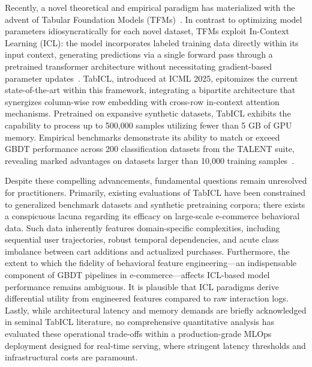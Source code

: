 \documentclass[conference]{IEEEtran}
\begin{document}
Recently, a novel theoretical and empirical paradigm has materialized with the advent of Tabular Foundation Models (TFMs)~\cite{hollmann2024tabpfnv2}. In contrast to optimizing model parameters idiosyncratically for each novel dataset, TFMs exploit In-Context Learning (ICL): the model incorporates labeled training data directly within its input context, generating predictions via a single forward pass through a pretrained transformer architecture without necessitating gradient-based parameter updates~\cite{vanbreugel2024why}. TabICL, introduced at ICML 2025, epitomizes the current state-of-the-art within this framework, integrating a bipartite architecture that synergizes column-wise row embedding with cross-row in-context attention mechanisms. Pretrained on expansive synthetic datasets, TabICL exhibits the capability to process up to 500,000 samples utilizing fewer than 5 GB of GPU memory. Empirical benchmarks demonstrate its ability to match or exceed GBDT performance across 200 classification datasets from the TALENT suite, revealing marked advantages on datasets larger than 10,000 training samples~\cite{qu2025tabicl}.

Despite these compelling advancements, fundamental questions remain unresolved for practitioners. Primarily, existing evaluations of TabICL have been constrained to generalized benchmark datasets and synthetic pretraining corpora; there exists a conspicuous lacuna regarding its efficacy on large-scale e-commerce behavioral data. Such data inherently features domain-specific complexities, including sequential user trajectories, robust temporal dependencies, and acute class imbalance between cart additions and actualized purchases. Furthermore, the extent to which the fidelity of behavioral feature engineering---an indispensable component of GBDT pipelines in e-commerce---affects ICL-based model performance remains ambiguous. It is plausible that ICL paradigms derive differential utility from engineered features compared to raw interaction logs. Lastly, while architectural latency and memory demands are briefly acknowledged in seminal TabICL literature, no comprehensive quantitative analysis has evaluated these operational trade-offs within a production-grade MLOps deployment designed for real-time serving, where stringent latency thresholds and infrastructural costs are paramount.
\end{document}
